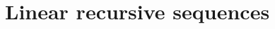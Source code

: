 

\setcounter{section}{1}
\setcounter{subsection}{1}
\setcounter{dfn}{0}

\section{Linear recursive sequences}


